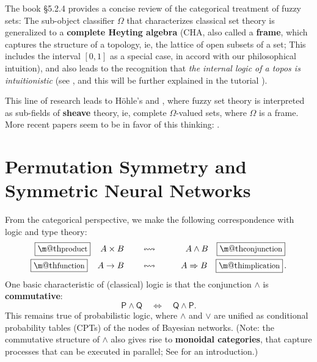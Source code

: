 \documentclass[orivec]{llncs}
\makeatletter
\renewcommand{\boxed}[1]{\fbox{\m@th$\displaystyle\scalebox{0.9}{#1}$} \,}
\makeatother
\begin{document}
The book \cite{Belohlavek2017} \S5.2.4 provides a concise review of the categorical treatment of fuzzy sets:  The sub-object classifier $\Omega$ that characterizes classical set theory is generalized to a \textbf{complete Heyting algebra} (CHA, also called a \textbf{frame}, which captures the structure of a topology, ie, the lattice of open subsets of a set;  This includes the interval $[0,1]$ as a special case, in accord with our philosophical intuition), and also leads to the recognition that \textit{the internal logic of a topos is intuitionistic} (see \cite{MacLane1992}, and this will be further explained in the tutorial \cite{Yan2021}).

This line of research leads to H\"{o}hle's \cite{Hohle2007} and \cite{Hohle2007b}, where fuzzy set theory is interpreted as sub-fields of \textbf{sheave} theory, ie, complete $\Omega$-valued sets, where $\Omega$ is a frame.  More recent papers seem to be in favor of this thinking: \cite{Jardine2019} \cite{Vickers2010}.


\section{Permutation Symmetry and Symmetric Neural Networks}
\label{sec:commutative-structure}

From the categorical perspective, we make the following correspondence with logic and type theory:
\begin{eqnarray}
\boxed{\mbox{product}} \quad A \times B \qquad & \leftrightsquigarrow & \qquad A \wedge B \quad \boxed{\mbox{conjunction}} \nonumber \\
\boxed{\mbox{function}} \quad A \rightarrow B \qquad & \leftrightsquigarrow & \qquad A \Rightarrow B \quad \boxed{\mbox{implication}}.
\end{eqnarray}
One basic characteristic of (classical) logic is that the conjunction $\wedge$ is \textbf{commutative}:
\begin{equation}
\mathsf{P} \wedge \mathsf{Q} \quad \Leftrightarrow \quad \mathsf{Q} \wedge \mathsf{P} .
\end{equation}
This remains true of probabilistic logic, where $\wedge$ and $\vee$ are unified as conditional probability tables (CPTs) of the nodes of Bayesian networks.  (Note: the commutative structure of $\wedge$ also gives rise to \textbf{monoidal categories}, that capture processes that can be executed in parallel; See \cite{Heunen2019} for an introduction.)
\end{document}
